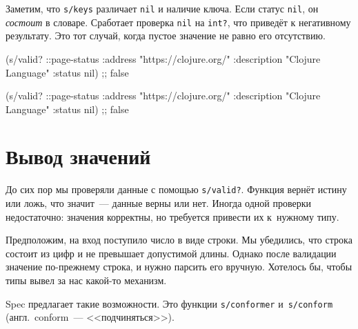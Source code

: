 
Заметим, что \verb|s/keys| различает \verb|nil| и наличие ключа. Если статус
\verb|nil|, он \emph{состоит} в словаре. Сработает проверка \verb|nil| на
\verb|int?|, что приведёт к негативному результату. Это тот случай, когда пустое
значение не равно его отсутствию.

\ifx\DEVICETYPE\MOBILE

\begin{english}
  \begin{clojure}
(s/valid? ::page-status
  {:address "https://clojure.org/"
   :description "Clojure Language"
   :status nil})
;; false
  \end{clojure}
\end{english}

\else

\begin{english}
  \begin{clojure}
(s/valid? ::page-status
          {:address "https://clojure.org/"
           :description "Clojure Language"
           :status nil})
;; false
  \end{clojure}
\end{english}

\fi

\section{Вывод значений}

\label{spec-conform}


До сих пор мы проверяли данные с помощью \verb|s/valid?|. Функция вернёт истину
или ложь, что значит~--- данные верны или нет. Иногда одной проверки
недостаточно: значения корректны, но требуется привести их к~нужному типу.

Предположим, на вход поступило число в виде строки. Мы убедились, что строка
состоит из цифр и не превышает допустимой длины. Однако после валидации значение
по-прежнему строка, и нужно парсить его вручную. Хотелось бы, чтобы типы вывел
за нас какой-то механизм.


\mnoindent
Spec предлагает такие возможности. Это функции \verb|s/conformer|
и~\verb|s/conform| (англ.~conform~--- <<подчиняться>>).

\label{spec-invalid}



